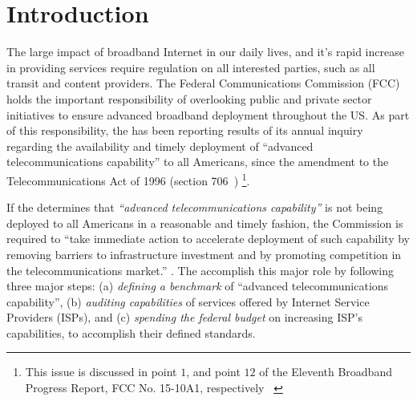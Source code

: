 \section{Introduction}
\label{sec:intro}



The large impact of broadband Internet in our daily lives, and it’s rapid increase in providing
services require regulation on all interested parties, such as all transit and content providers.
The Federal Communications Commission (FCC) holds the important responsibility of overlooking public
and private sector initiatives to ensure advanced broadband deployment throughout the US. As part of
this responsibility, the \FCC has been reporting results of its annual inquiry regarding the
availability and timely deployment of ``advanced telecommunications capability'' to all Americans,
since the amendment to the Telecommunications Act of 1996 (section 706~\cite{fcc1996telecom-act})
\footnote{This issue is discussed in point $1$, and point $12$ of the Eleventh Broadband Progress Report, FCC No. 15-10A1, respectively ~\cite{fcc2015progress-report}\label{foot:fcc-issues}}.


If the \FCC determines that \emph{``advanced telecommunications capability''} is not being deployed
to all Americans in a reasonable and timely fashion, the Commission is required to ``take immediate
action to accelerate deployment of such capability by removing barriers to infrastructure investment
and by promoting competition in the telecommunications market.'' .
The \FCC accomplish this major role by following three major steps:
(a) \emph{defining a benchmark} of ``advanced telecommunications capability'', (b) \emph{auditing
capabilities} of services offered by Internet Service Providers (ISPs), and (c) \emph{spending the
federal budget} on increasing ISP’s capabilities, to accomplish their defined standards.


